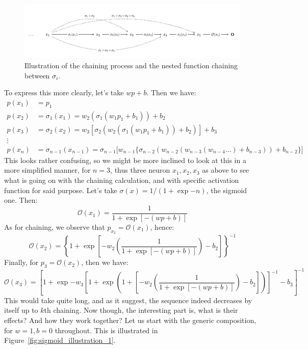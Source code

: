 \begin{figure}[!htp]
    \centering
    \includegraphics[width=\textwidth]{img/function.png}
    \caption{Illustration of the chaining process and the nested function chaining between $\sigma_{i}$.}
\end{figure}
To express this more clearly, let's take $wp+b$. Then we have: 
\begin{align*}
    p(x_{1}) &= p_{1}\\
    p(x_{2}) & = \sigma_{1}(x_{1})=w_{2}(\sigma_{1}(w_{1}p_{1}+b_{1}))+b_{2}\\
    p(x_{3}) & = \sigma_{2}(x_{2})= w_{3}[\sigma_{2}(w_{2}(\sigma_{1}(w_{1}p_{1}+b_{1}))+b_{2})]+b_{3}\\
    \vdots & \\
    p(x_{n}) & = \sigma_{n-1}(x_{n-1}) = \sigma_{n-1}\Big[w_{n-1} \{ \sigma_{n-2}(w_{n-2}(w_{n-3}(w_{n-4}\dots)+b_{n-3})) + b_{n-2} \}\Big]
\end{align*}
This looks rather confusing, so we might be more inclined to look at this in a more simplified manner, for $n=3$, thus three neuron $x_{1},x_{2},x_{3}$ as above to see what is going on with the chaining calculation, and with specific activation function for said purpose. Let's take $\sigma(x)=1/(1+\exp{-n})$, the sigmoid one. Then: 
\begin{equation}
    \mathcal{O}(x_{1}) = \frac{1}{1+\exp{[-(wp+b)]}}
\end{equation}
As for chaining, we observe that $p_{x_{2}}=\mathcal{O}(x_{1})$, hence: 
\begin{equation}
    \mathcal{O}(x_{2}) = \left\{ 1+ \exp{\left[ -w_{2}\left( \frac{1}{1+\exp{[-(wp+b)]}}\right) - b_{2} \right]} \right\}^{-1}
\end{equation}
Finally, for $p_{3}=\mathcal{O}(x_{2})$, then we have: 
\begin{equation}
\mathcal{O}(x_{3})
=
\left[ 1+ \exp{-w_{3}\left[ 1+ \exp{\left(1+\left[ -w_{2}\left( \frac{1}{1+\exp{[-(wp+b)]}}\right) - b_{2} \right]\right)} \right]^{-1} - b_{3}} \right]^{-1}
\end{equation}
This would take quite long, and as it suggest, the sequence indeed decreases by itself up to $k$th chaining. Now though, the interesting part is, what is their effects? And how they work together? Let us start with the generic composition, for $w=1, b=0$ throughout. This is illustrated in Figure~\ref{fig:sigmoid_illustration_1}. 

